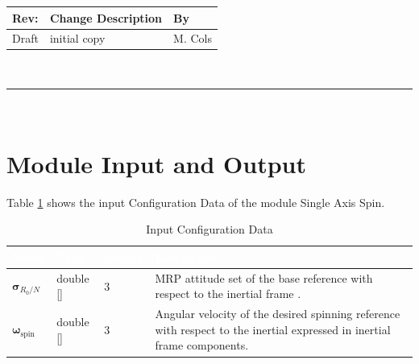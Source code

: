 \documentclass[]{AVSSimReportMemo}
\begin{document}
\makeCover


%
%
\pagestyle{empty}
{\renewcommand{\arraystretch}{2}
\noindent
\begin{longtable}{|p{0.5in}|p{4.5in}|p{1.14in}|}
\hline
{\bfseries Rev}: & {\bfseries Change Description} & {\bfseries By} \\
\hline
Draft & initial copy & M. Cols \\
\hline

\end{longtable}
}

\newpage
\setcounter{page}{1}
\pagestyle{fancy}

\tableofcontents
~\\ \hrule ~\\

\section{Module Input and Output}
Table \ref{tab:inputTable} shows the input Configuration Data of the module Single Axis Spin.
\begin{table}[h!]
	\centering
	\caption{Input Configuration Data}
	\begin{tabular}{|l|l|l|p{3in}|}
		\hline
		\rowcolor{BrickRed}
		\textcolor{white}{Name} & \textcolor{white}{Type} & 
		\textcolor{white}{Length} & 
		\textcolor{white}{Description}  \\ \hline
		$\bm{\sigma}_{R_0/N}$ & double [] & 3 & 
		MRP attitude set of the base reference with respect to the inertial frame . \\ \hline
		$\bm{\omega}_{\textrm{spin}}$& double [] & 3 & 
		Angular velocity of the desired spinning reference with respect to the inertial expressed in inertial frame components. \\ \hline
	\end{tabular}
	\label{tab:inputTable}
\end{table}
\end{document}

